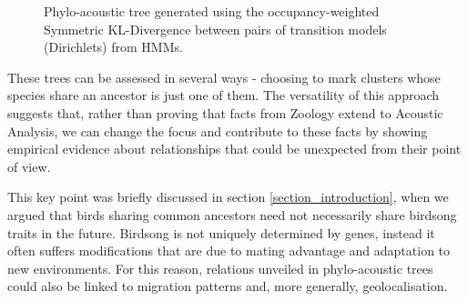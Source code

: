 \documentclass[pdftex,11pt,a4paper]{article}
\theoremstyle{definition}
\theoremstyle{remark}
\begin{document}
\begin{figure}
\noindent{}
    \caption{Phylo-acoustic tree generated using the occupancy-weighted Symmetric KL-Divergence between pairs of transition models (Dirichlets) from HMMs.}
    \label{fig:hmmweighted}
\end{figure}
\clearpage
\par These trees can be assessed in several ways - choosing to mark clusters whose species share an ancestor is just one of them. The versatility of this approach suggests that, rather than proving that facts from Zoology extend to Acoustic Analysis, we can change the focus and contribute to these facts by showing empirical evidence about relationships that could be unexpected from their point of view.
\par This key point was briefly discussed in section \ref{section_introduction}, when we argued that birds sharing common ancestors need not necessarily share birdsong traits in the future. Birdsong is not uniquely determined by genes, instead it often suffers modifications that are due to mating advantage and adaptation to new environments. For this reason, relations unveiled in phylo-acoustic trees could also be linked to migration patterns and, more generally, geolocalisation.
\end{document}
